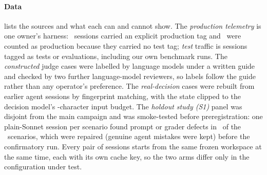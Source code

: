 \paragraph{Data}  lists the sources and what each can and cannot show. The \emph{production
telemetry} is one owner's harness: \ObProdTagged\ sessions carried an explicit production tag and \ObProdDefault\ were
counted as production because they carried no test tag; \emph{test} traffic is sessions tagged as tests or
evaluations, including our own benchmark runs. The \emph{constructed} judge cases were labelled by language models
under a written guide and checked by two further language-model reviewers, so labels follow the guide rather than any
operator's preference. The \emph{real-decision} cases were rebuilt from earlier agent sessions by fingerprint matching,
with the state clipped to the decision model's \TrStateBudget-character input budget. The \emph{holdout study (S1)}
panel was disjoint from the main campaign and was smoke-tested before preregistration: one plain-Sonnet session per
scenario found prompt or grader defects in \SmokeFixed\ of the \SmokeN\ scenarios, which were repaired (genuine agent
mistakes were kept) before the confirmatory run. Every pair of sessions starts from the same frozen workspace at the
same time, each with its own cache key, so the two arms differ only in the configuration under test.

